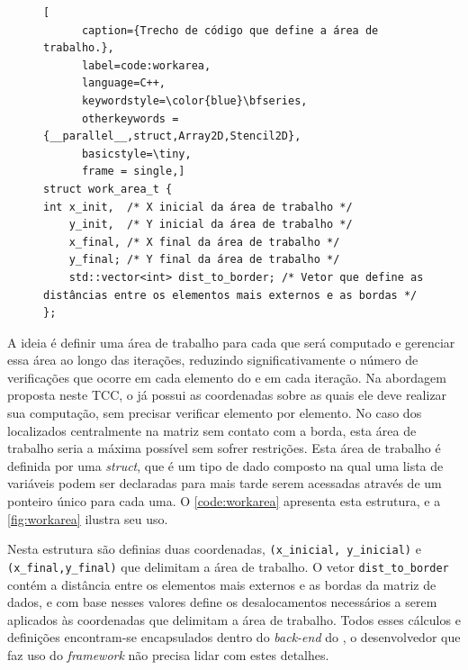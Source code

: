 \begin{figure}
  \begin{lstlisting}[
      caption={Trecho de código que define a área de trabalho.}, 
      label=code:workarea,
      language=C++,
      keywordstyle=\color{blue}\bfseries,
      otherkeywords = {__parallel__,struct,Array2D,Stencil2D}, 
      basicstyle=\tiny, 
      frame = single,]
struct work_area_t {
int x_init,  /* X inicial da área de trabalho */
    y_init,  /* Y inicial da área de trabalho */
    x_final, /* X final da área de trabalho */
    y_final; /* Y final da área de trabalho */
    std::vector<int> dist_to_border; /* Vetor que define as distâncias entre os elementos mais externos e as bordas */
};
  \end{lstlisting}
\end{figure}

A ideia é definir uma área de trabalho para cada \tile que será computado e gerenciar essa área ao longo das iterações, reduzindo significativamente o número de verificações que ocorre em cada elemento do \tile e em cada iteração. Na abordagem proposta neste TCC, o \cluster já possui as coordenadas sobre as quais ele deve realizar sua computação, sem precisar verificar elemento por elemento. No caso dos \tiles localizados centralmente na matriz sem contato com a borda, esta área de trabalho seria a máxima possível sem sofrer restrições.
Esta área de trabalho é definida por uma \textit{struct}, que é um tipo de dado composto na qual uma lista de variáveis podem ser declaradas para mais tarde serem acessadas através de um ponteiro único para cada uma. O \autoref{code:workarea} apresenta esta estrutura, e a \autoref{fig:workarea} ilustra seu uso.


Nesta estrutura são definias duas coordenadas, \texttt{(x\_inicial, y\_inicial)} e \texttt{(x\_final,y\_final)} que delimitam a área de trabalho. O vetor \texttt{dist\_to\_border} contém a distância entre os elementos mais externos e as bordas da matriz de dados, e com base nesses valores define os desalocamentos necessários a serem aplicados às coordenadas que delimitam a área de trabalho. Todos esses cálculos e definições encontram-se encapsulados dentro do \textit{back-end} do \pskelmppa \async, o desenvolvedor que faz uso do \textit{framework} não precisa lidar com estes detalhes. 

